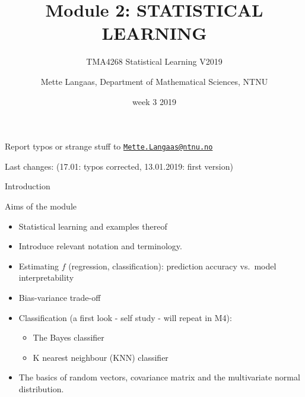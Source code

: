 \documentclass[ignorenonframetext,]{beamer}
\title{Module 2: STATISTICAL LEARNING}
\subtitle{TMA4268 Statistical Learning V2019}
\author{Mette Langaas, Department of Mathematical Sciences, NTNU}
\date{week 3 2019}
\providecommand{\tightlist}{%
  \setlength{\itemsep}{0pt}\setlength{\parskip}{0pt}}
\begin{document}
\frame{\titlepage}

\begin{frame}

Report typos or strange stuff to
\href{mailto:Mette.Langaas@ntnu.no}{\nolinkurl{Mette.Langaas@ntnu.no}}

Last changes: (17.01: typos corrected, 13.01.2019: first version)

\end{frame}

\begin{frame}{Introduction}

\begin{block}{Aims of the module}

\begin{itemize}
\tightlist
\item
  Statistical learning and examples thereof
\item
  Introduce relevant notation and terminology.
\item
  Estimating \(f\) (regression, classification): prediction accuracy
  vs.~model interpretability
\item
  Bias-variance trade-off
\item
  Classification (a first look - self study - will repeat in M4):

  \begin{itemize}
  \tightlist
  \item
    The Bayes classifier
  \item
    K nearest neighbour (KNN) classifier
  \end{itemize}
\item
  The basics of random vectors, covariance matrix and the multivariate
  normal distribution.
\end{itemize}

\end{block}

\end{frame}
\end{document}
